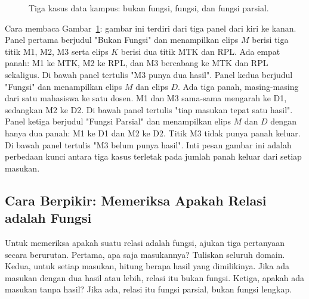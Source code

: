 \documentclass[11pt,a4paper]{article}
\begin{document}
\begin{figure}[H]
{}
	\caption{Tiga kasus data kampus: bukan fungsi, fungsi, dan fungsi parsial.}
	\label{fig:tiga-kasus}
\end{figure}

Cara membaca Gambar~\ref{fig:tiga-kasus}: gambar ini terdiri dari tiga panel dari kiri ke kanan. Panel pertama berjudul "Bukan Fungsi" dan menampilkan elips $M$ berisi tiga titik M1, M2, M3 serta elips $K$ berisi dua titik MTK dan RPL. Ada empat panah: M1 ke MTK, M2 ke RPL, dan M3 bercabang ke MTK dan RPL sekaligus. Di bawah panel tertulis "M3 punya dua hasil". Panel kedua berjudul "Fungsi" dan menampilkan elips $M$ dan elips $D$. Ada tiga panah, masing-masing dari satu mahasiswa ke satu dosen. M1 dan M3 sama-sama mengarah ke D1, sedangkan M2 ke D2. Di bawah panel tertulis "tiap masukan tepat satu hasil". Panel ketiga berjudul "Fungsi Parsial" dan menampilkan elips $M$ dan $D$ dengan hanya dua panah: M1 ke D1 dan M2 ke D2. Titik M3 tidak punya panah keluar. Di bawah panel tertulis "M3 belum punya hasil". Inti pesan gambar ini adalah perbedaan kunci antara tiga kasus terletak pada jumlah panah keluar dari setiap masukan.

\subsection{Cara Berpikir: Memeriksa Apakah Relasi adalah Fungsi}

Untuk memeriksa apakah suatu relasi adalah fungsi, ajukan tiga pertanyaan secara berurutan. Pertama, apa saja masukannya? Tuliskan seluruh domain. Kedua, untuk setiap masukan, hitung berapa hasil yang dimilikinya. Jika ada masukan dengan dua hasil atau lebih, relasi itu bukan fungsi. Ketiga, apakah ada masukan tanpa hasil? Jika ada, relasi itu fungsi parsial, bukan fungsi lengkap.
\end{document}
